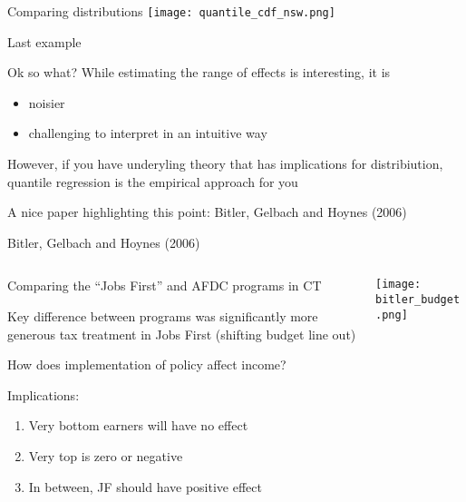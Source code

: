 \documentclass[notes,11pt, aspectratio=169]{beamer}
\newenvironment{wideitemize}{\itemize\addtolength{\itemsep}{10pt}}{\enditemize}
\begin{document}
\begin{frame}{Comparing distributions}
        \texttt{[image: quantile\_cdf\_nsw.png]}
\end{frame}

\begin{frame}{Last example}
  \begin{wideitemize}
  \item Ok so what? While estimating the range of effects is interesting, it is
    \begin{itemize}
    \item noisier
    \item challenging to interpret in an intuitive way
    \end{itemize}
  \item However, if you have underyling theory that has implications for
    distribiution, quantile regression is the empirical approach for you
  \item A nice paper highlighting this point: Bitler, Gelbach and Hoynes (2006)
  \end{wideitemize}
\end{frame}

\begin{frame}{Bitler, Gelbach and Hoynes (2006)}
  \begin{columns}[T] %
\begin{column}{.5\textwidth}
  \begin{wideitemize}
  \item Comparing the ``Jobs First'' and AFDC programs in CT
  \item Key difference between programs was significantly more
    generous tax treatment in Jobs First (shifting budget line out)
  \item How does implementation of policy affect income?
  \item Implications:
    \begin{enumerate}
    \item Very bottom earners will have no effect
    \item Very top is zero or negative
    \item In between, JF should have positive effect
    \end{enumerate}
  \end{wideitemize}
  \end{column}%
  \hfill%
  \begin{column}{.5\textwidth}
    \texttt{[image: bitler\_budget.png]}
  \end{column}
\end{columns}
\end{frame}
\end{document}
